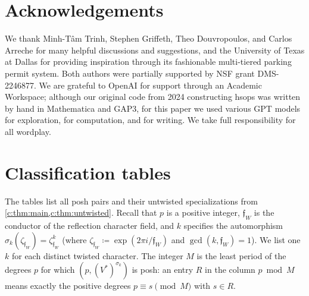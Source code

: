 \documentclass[11pt]{amsart}
\newcommand{\defeq}{\coloneqq}
\theoremstyle{definition}
\begin{document}
\section*{Acknowledgements}
We thank Minh-T\^am Trinh, Stephen Griffeth, Theo Douvropoulos, and Carlos Arreche for many
helpful discussions and suggestions, and the University of Texas at Dallas for providing inspiration through its fashionable multi-tiered parking permit system. Both authors were partially supported by
NSF grant DMS-2246877. We are grateful to OpenAI for support through an Academic Workspace; although our original code from 2024 constructing hsops was written by hand in Mathematica and GAP3, for this paper we used various GPT models for exploration, for computation, and for writing.  We take full responsibility for all wordplay.%

\appendix
\section{Classification tables}\label{sec:tables}

The tables list all posh pairs and their untwisted specializations
from \cref{c:thm:main,c:thm:untwisted}. %
Recall that $p$ is a positive integer, $\mathfrak f_W$ is the conductor of the reflection character
field, and $k$ specifies the automorphism
$\sigma_k(\zeta_{\mathfrak f_W})=\zeta_{\mathfrak f_W}^k$ (where
$\zeta_{\mathfrak f_W}\defeq\exp(2\pi i/\mathfrak f_W)$ and
$\gcd(k,\mathfrak f_W)=1$). We list one $k$ for each distinct twisted
character. The integer $M$ is the least period of the degrees $p$
for which $(p,(V^*)^{\sigma_k})$ is posh: an entry $R$
in the column $p\bmod M$ means exactly the positive degrees
$p\equiv s\pmod M$ with $s\in R$. %
\end{document}

